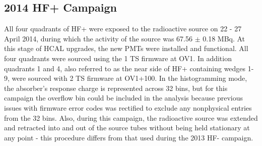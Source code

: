 
\subsection{2014 HF+ Campaign}
All four quadrants of HF+ were exposed to the radioactive source on 22 - 27 April
2014, during which the activity of the source was 67.56 $\pm$ 0.18 \unit{MBq}.
At this stage of HCAL upgrades, the new PMTs were installed and functional.
All four quadrants were sourced using the 1 TS firmware at OV1. In addition quadrants 1 and 4, also referred to as the near side of HF+ containing wedges
1-9, were sourced with 2 TS firmware at OV1+100. In the histogramming mode, the
absorber's response charge is represented across 32 bins, but for this campaign
the overflow bin could be included in the analysis because previous issues with
firmware error codes was rectified to exclude any nonphysical entries from the
32 bins. Also, during this campaign, the radioactive source was extended and
retracted into and out of the source tubes without being held stationary at any
point - this procedure differs from that used during the 2013 HF- campaign.


